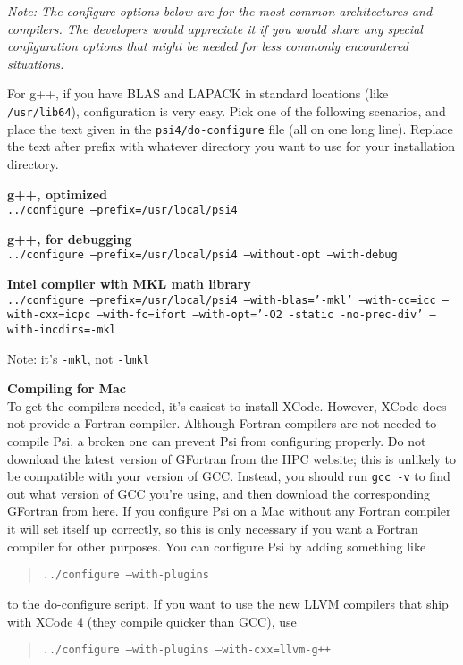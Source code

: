 \documentclass[12pt]{article}
\begin{document}
{\em Note: The configure options below are for the most common
architectures and compilers. The developers would appreciate it if you
would share any special configuration options that might be needed for
less commonly encountered situations.  }

For g++, if you have BLAS and LAPACK in standard locations (like {\tt
/usr/lib64}), configuration is very easy. Pick one of the following
scenarios, and place the text given in the {\tt psi4/do-configure} file
(all on one long line). Replace the text after prefix with whatever
directory you want to use for your installation directory.

\noindent
{\bf g++, optimized} \\
{\tt ../configure --prefix=/usr/local/psi4}

\noindent
{\bf g++, for debugging} \\
{\tt ../configure --prefix=/usr/local/psi4 --without-opt --with-debug}

\pagebreak

\noindent
{\bf Intel compiler with MKL math library} \\
{\tt ../configure --prefix=/usr/local/psi4 --with-blas='-mkl' --with-cc=icc
--with-cxx=icpc --with-fc=ifort  --with-opt='-O2 -static -no-prec-div'
--with-incdirs=-mkl}

Note: it's {\tt -mkl}, not {\tt -lmkl}

\noindent
{\bf Compiling for Mac} \\
To get the compilers needed, it's easiest to install XCode. However, XCode
does not provide a Fortran compiler. Although Fortran compilers are not needed
to compile Psi, a broken one can prevent Psi from configuring properly. Do not
download the latest version of GFortran from the HPC website; this is unlikely
to be compatible with your version of GCC. Instead, you should run {\tt gcc
-v} to find out what version of GCC you're using, and then download the
corresponding GFortran from  here. If you configure Psi on a Mac without any
Fortran compiler it will set itself up correctly, so this is only necessary if
you want a Fortran compiler for other purposes. You can configure Psi by
adding something like
\begin{quotation}
\noindent
{\tt ../configure --with-plugins}
\end{quotation}
to the do-configure script. If you want to use the new LLVM compilers that
ship with XCode 4 (they compile quicker than GCC), use
\begin{quotation}
\noindent
{\tt ../configure --with-plugins --with-cxx=llvm-g++}
\end{quotation}
\end{document}

